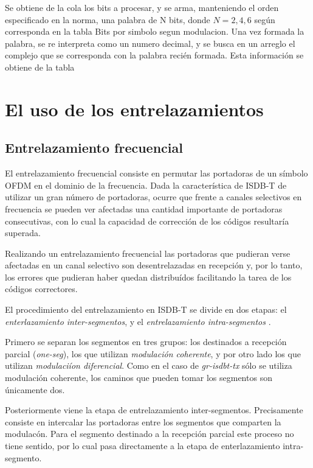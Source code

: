 Se obtiene de la cola los bits a procesar, y se arma, manteniendo el orden especificado en la norma, una palabra de N bits, donde $N={2,4,6}$ según corresponda en la tabla \tablename{Bits por simbolo segun modulacion}. Una vez formada la palabra, se re interpreta como un numero decimal, y se busca en un arreglo el complejo que se corresponda con la palabra recién formada. Esta información se obtiene de la tabla   

\section{El uso de los entrelazamientos}

\subsection{Entrelazamiento frecuencial}

El entrelazamiento frecuencial consiste en permutar las portadoras de un s\'imbolo OFDM en el dominio de la frecuencia. Dada la caracter\'istica de ISDB-T de utilizar un gran n\'umero de portadoras, ocurre que frente a canales selectivos en frecuencia se pueden ver afectadas una cantidad importante de portadoras consecutivas, con lo cual la capacidad de correcci\'on de los c\'odigos resultar\'ia superada.

Realizando un entrelazamiento frecuencial las portadoras que pudieran verse afectadas en un canal selectivo son desentrelazadas en recepci\'on y, por lo tanto, los errores que pudieran haber quedan distribu\'idos facilitando la tarea de los c\'odigos correctores.

El procedimiento del entrelazamiento en ISDB-T se divide en dos etapas: el \textit{enterlazamiento inter-segmentos}, y el \textit{entrelazamiento intra-segmentos }.

Primero se separan los segmentos en tres grupos: los destinados a recepci\'on parcial (\textit{one-seg}), los que utilizan \textit{modulaci\'on coherente}, y por otro lado los que utilizan \textit{modulaci\'ion diferencial}. Como en el caso de \textit{gr-isdbt-tx} s\'olo se utiliza modulaci\'on coherente, los caminos que pueden tomar los segmentos son \'unicamente dos.

Posteriormente viene la etapa de entrelazamiento inter-segmentos. Precisamente consiste en intercalar las portadoras entre los segmentos que comparten la modulac\'on. Para el segmento destinado a la recepci\'on parcial este proceso no tiene sentido, por lo cual pasa directamente a la etapa de enterlazamiento intra-segmento.

